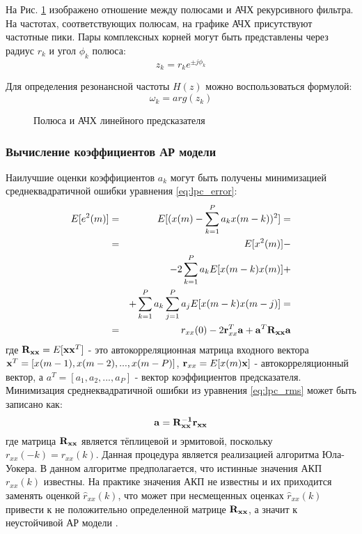 На Рис. \ref{pic:lpc_poles} изображено отношение между полюсами и АЧХ рекурсивного фильтра. На частотах, соответствующих полюсам,
на графике АЧХ присутствуют частотные пики. Пары комплексных корней могут быть представлены через радиус ${r_k}$ и угол ${\phi_k}$
полюса:
\begin{equation}
	\label{eq:lpc_poles}
	z_k = r_k e^{\pm j \phi_k}
\end{equation}

Для определения резонансной частоты ${H(z)}$ можно воспользоваться формулой:
\begin{equation}
	\label{eq:lpc_poles_freq}
	\omega_k = arg(z_k)
\end{equation}

\begin{figure}[h]
	\center{}
	\caption{Полюса и АЧХ линейного предсказателя}
	\label{pic:lpc_poles}
\end{figure}

\subsubsection{Вычисление коэффициентов АР модели}
Наилучшие оценки коэффициентов ${a_k}$ могут быть получены минимизацией среднеквадратичной ошибки уравнения \cite{saeed_book} \ref{eq:lpc_error}:
\begin{eqnarray}
	\label{eq:lpc_rms}
		E[e^2(m)]	& = & E[(x(m) - \sum \limits_{k=1}^P a_k x(m-k))^2] =\nonumber \\
				& = & E[x^2(m)] - \nonumber \\
				& &  - 2\sum \limits_{k=1}^P a_k E[x(m-k)x(m)] + \nonumber \\
				& &  + \sum \limits_{k=1}^P a_k \sum \limits_{j=1}^P a_j E[x(m-k)x(m-j)] = \nonumber \\
				& = & r_{xx}(0) - 2{\bf r}^T_{xx}{\bf a} + {\bf a}^T {\bf R_{xx}a}
\end{eqnarray}
где ${{\bf R_{xx}} = E[{\bf xx}^T]}$ - это автокорреляционная матрица входного вектора \\
${{\bf x}^T=[x(m-1),x(m-2),...,x(m-P)]}$,
${{\bf r}_{xx}=E[x(m){\bf x}]}$ - автокорреляционный вектор, а ${a^T=[a_1,a_2,...,a_P]}$ -  вектор коэффициентов предсказателя.
Минимизация среднеквадратичной ошибки из уравнения \ref{eq:lpc_rms} может быть записано как:
\begin{equation}
	\label{eq:lpc_rms2}
	{\bf a=R^{-1}_{xx}r_{xx}}
\end{equation}
где матрица ${\bf R_{xx}}$ является тёплицевой и эрмитовой, поскольку  ${r_{xx}(-k) = r_{xx}(k)}$. Данная
процедура является реализацией алгоритма Юла-Уокера. В данном алгоритме предполагается, что истинные значения
АКП ${r_{xx}(k)}$ известны. На практике значения АКП не известны и их приходится заменять оценкой ${\hat{r}_{xx}(k)}$, что может
при несмещенных оценках ${\hat{r}_{xx}(k)}$ привести к не положительно определенной матрице ${\bf {R_{xx}}}$, а значит
к неустойчивой АР модели \cite{bolshakov-book}.

